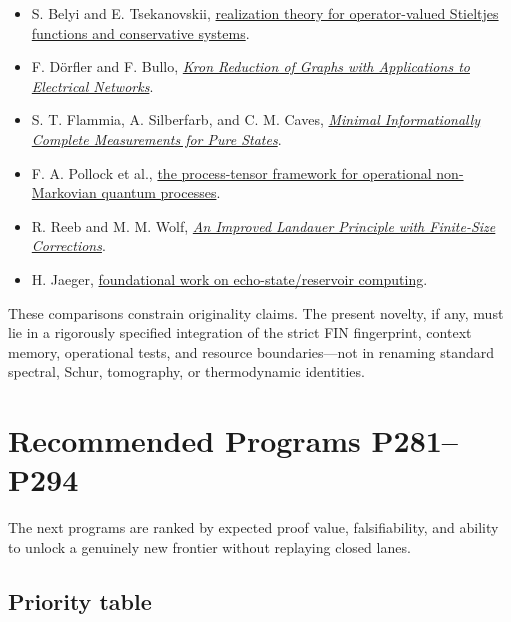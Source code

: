 \documentclass[11pt,a4paper,openany]{report}
\begin{document}
\begin{itemize}
\item 
S. Belyi and E. Tsekanovskii, \href{https://arxiv.org/abs/0708.0452}{realization theory for operator-valued Stieltjes functions and conservative systems}.

\item 
F. Dörfler and F. Bullo, \href{https://arxiv.org/abs/1102.2950}{\emph{Kron Reduction of Graphs with Applications to Electrical Networks}}.

\item 
S. T. Flammia, A. Silberfarb, and C. M. Caves, \href{https://arxiv.org/abs/quant-ph/0404137}{\emph{Minimal Informationally Complete Measurements for Pure States}}.

\item 
F. A. Pollock et al., \href{https://arxiv.org/abs/1512.00589}{the process-tensor framework for operational non-Markovian quantum processes}.

\item 
R. Reeb and M. M. Wolf, \href{https://arxiv.org/abs/1306.4352}{\emph{An Improved Landauer Principle with Finite-Size Corrections}}.

\item 
H. Jaeger, \href{https://publica.fraunhofer.de/entities/publication/9dfaead1-4dc0-4e3c-b89b-596f50f671c1}{foundational work on echo-state/\allowbreak{}reservoir computing}.

\end{itemize}

These comparisons constrain originality claims. The present novelty, if any, must lie in a rigorously specified integration of the strict FIN fingerprint, context memory, operational tests, and resource boundaries---not in renaming standard spectral, Schur, tomography, or thermodynamic identities.

\chapter{Recommended Programs P281--P294}

The next programs are ranked by expected proof value, falsifiability, and ability to unlock a genuinely new frontier without replaying closed lanes.

\section{Priority table}
\end{document}

